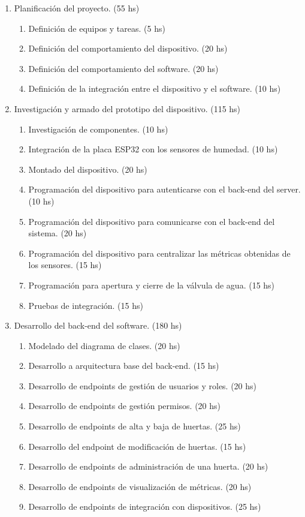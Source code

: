 \documentclass[
11pt, %
codirector, %
]{charter}
\begin{document}
\begin{enumerate}
\item Planificación del proyecto. (55 hs)
	\begin{enumerate}
	\item Definición de equipos y tareas. (5 hs)
	\item Definición del comportamiento del dispositivo. (20 hs)
	\item Definición del comportamiento del software. (20 hs)
	\item Definición de la integración entre el dispositivo y el software. (10 hs)
	\end{enumerate}
	
\item Investigación y armado del prototipo del dispositivo. (115 hs)
	\begin{enumerate}
	\item Investigación de componentes. (10 hs)
	\item Integración de la placa ESP32 con los sensores de humedad. (10 hs)
	\item Montado del dispositivo. (20 hs)
	\item Programación del dispositivo para autenticarse con el back-end del server. (10 hs)
	\item Programación del dispositivo para comunicarse con el back-end del sistema. (20 hs)
	\item Programación del dispositivo para centralizar las métricas obtenidas de los sensores. (15 hs)
	\item Programación para apertura y cierre de la válvula de agua. (15 hs)
	\item Pruebas de integración. (15 hs)
	\end{enumerate}
	
\item Desarrollo del back-end del software. (180 hs)
	\begin{enumerate}
	\item Modelado del diagrama de clases. (20 hs)
	\item Desarrollo a arquitectura base del back-end. (15 hs)
	\item Desarrollo de endpoints de gestión de usuarios y roles. (20 hs)
	\item Desarrollo de endpoints de gestión permisos. (20 hs)
	\item Desarrollo de endpoints de alta y baja de huertas. (25 hs)
	\item Desarrollo del endpoint de modificación de huertas. (15 hs)
	\item Desarrollo de endpoints de administración de una huerta. (20 hs)
	\item Desarrollo de endpoints de visualización de métricas. (20 hs)
	\item Desarrollo de endpoints de integración con dispositivos. (25 hs)
	\end{enumerate}
	

\end{enumerate}
\end{document}
